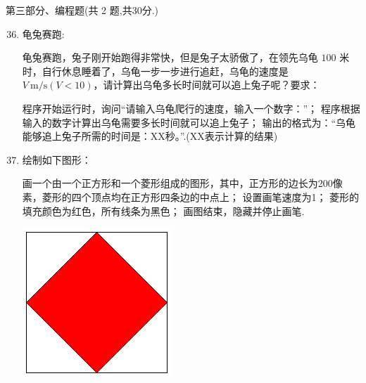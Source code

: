 \documentclass[11pt]{ctexart}
\begin{document}
    \newpage
    {\noindent\heiti 第三部分、编程题(共 2 题,共30分.)}
    \begin{enumerate}
        \setcounter{enumi}{35}
        
        \item 龟兔赛跑:
        
        龟兔赛跑，兔子刚开始跑得非常快，但是兔子太骄傲了，在领先乌龟 $100$ 米时，自行休息睡着了，乌龟一步一步进行追赶，乌龟的速度是 $V\ \mathrm{m/s}(V<10)$，请计算出乌龟多长时间就可以追上兔子呢？要求：
        \begin{tasks}[label=(\arabic*)]
            \task 程序开始运行时，询问“请输入乌龟爬行的速度，输入一个数字：”；
            \task 程序根据输入的数字计算出乌龟需要多长时间就可以追上兔子；
            \task 输出的格式为：“乌龟能够追上兔子所需的时间是：XX秒。”.(XX表示计算的结果)
        \end{tasks}
        \vfill

        \item 绘制如下图形：
        
        \begin{tasks}[label=(\arabic*)]
            \task 画一个由一个正方形和一个菱形组成的图形，其中，正方形的边长为200像素，菱形的四个顶点均在正方形四条边的中点上；
            \task 设置画笔速度为1；
            \task 菱形的填充颜色为红色，所有线条为黑色；
            \task 画图结束，隐藏并停止画笔.
        \end{tasks}
        \begin{center}
            \includegraphics[width=.1\textwidth]{37.png}
        \end{center}
        \vfill
    \end{enumerate}
\end{document}
